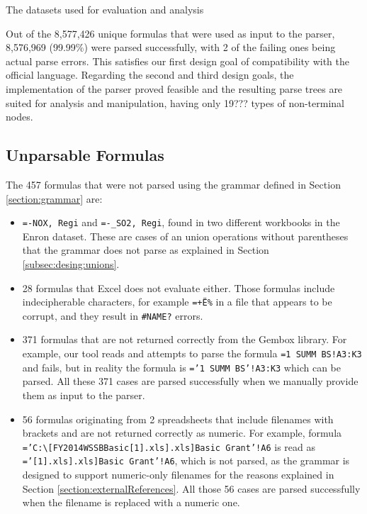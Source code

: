 \documentclass[times]{smrauth}
\begin{document}
\begin{table}[]
	\centering
	\caption{The datasets used for evaluation and analysis}
	\label{table:datasets}
	
\end{table}

Out of the 8,577,426 unique formulas that were used as input to the parser, 8,576,969 (99.99\%) were parsed successfully, with 2 of the failing ones being actual parse errors. This satisfies our first design goal of compatibility with the official language. Regarding the second and third design goals, the implementation of the parser proved feasible and the resulting parse trees are suited for analysis and manipulation, having only 19??? types of non-terminal nodes.

\subsection{Unparsable Formulas}
\label{subsection:unparsableFormulas}
The 457 formulas that were not parsed using the grammar defined in Section \ref{section:grammar} are:

\begin{itemize}
	\item \texttt{=-NOX, Regi} and \texttt{=-_SO2, Regi}, found in two different workbooks in the Enron dataset. These are cases of an union operations without parentheses that the grammar does not parse as explained in Section \ref{subsec:desing:unions}.
	\item 28 formulas that Excel does not evaluate either. Those formulas include indecipherable characters, for example \texttt{=+Ë\%} in a file that appears to be corrupt, and they result in \texttt{\#NAME?} errors.
	\item 371 formulas that are not returned correctly from the Gembox library. For example, our tool reads and attempts to parse the formula \texttt{=1 SUMM BS!A3:K3} and fails, but in reality the formula is \texttt{='1 SUMM BS'!A3:K3} which can be parsed. All these 371 cases are parsed successfully when we manually provide them as input to the parser.
	\item 56 formulas originating from 2 spreadsheets that include filenames with brackets and are not returned correctly as numeric. For example, formula \texttt{='C:\textbackslash[FY2014WSSBBasic[1].xls].xls]Basic Grant'!A6} is read as \texttt{='[1].xls].xls]Basic Grant'!A6}, which is not parsed, as the grammar is designed to support numeric-only filenames for the reasons explained in Section \ref{section:externalReferences}. All those 56 cases are parsed successfully when the filename is replaced with a numeric one.
\end{itemize}
\end{document}
